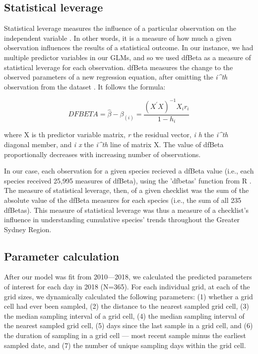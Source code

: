 \documentclass[9pt,twocolumn,twoside,lineno]{pnas-new}
\begin{document}
{\subsection*{Statistical leverage} Statistical leverage measures the influence of a particular observation on the independent variable \cite{cook1977detection}. In other words, it is a measure of how much a given observation influences the results of a statistical outcome. In our instance, we had multiple predictor variables in our GLMs, and so we used dfBeta as a measure of statistical leverage for each observation. dfBeta measures the change to the observed parameters of a new regression equation, after omitting the \textit{i^{th}} observation from the dataset \cite{belsley1980regression}. It follows the formula:

\begin{equation}
D F B E T A=\hat{\beta}-\beta_{(i)}=\frac{\left(X^{\prime} X\right)^{-1} X_{i} r_{i}}{1-h_{i}}
\end{equation}

where X is th predictor variable matrix, \textit{r} the residual vector, \textit{i h} the \textit{i^{th}} diagonal member, and \textit{i x} the \textit{i^{th}} line of matrix X. The value of dfBeta proportionally decreases with increasing number of observations.

In our case, each observation for a given species recieved a dfBeta value (i.e., each species received 25,995 measures of dfBeta), using the 'dfbetas' function from R \cite{rcoreteam2018r}. The measure of statistical leverage, then, of a given checklist was the sum of the absolute value of the dfBeta measures for each species (i.e., the sum of all 235 dfBetas). This measure of statistical leverage was thus a measure of a checklist's influence in understanding cumulative species' trends throughout the Greater Sydney Region.

\subsection*{Parameter calculation} After our model was fit from 2010---2018, we calculated the predicted parameters of interest for each day in 2018 (N=365). For each individual grid, at each of the grid sizes, we dynamically calculated the following parameters: (1) whether a grid cell had ever been sampled, (2) the distance to the nearest sampled grid cell, (3) the median sampling interval of a grid cell, (4) the median sampling interval of the nearest sampled grid cell, (5) days since the last sample in a grid cell, and (6) the duration of sampling in a grid cell --- most recent sample minus the earliest sampled date, and (7) the number of unique sampling days within the grid cell.

}
\end{document}
